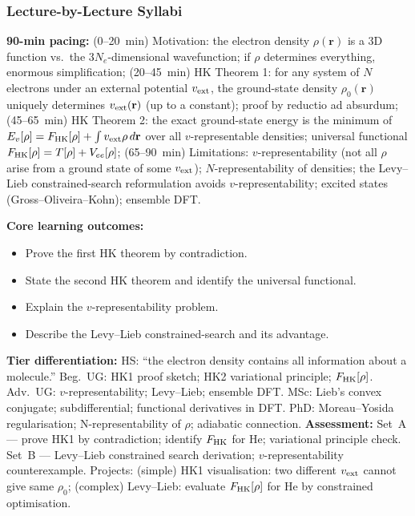 \documentclass[11pt,a4paper]{article}
\begin{document}
\subsubsection*{Lecture-by-Lecture Syllabi}

\begin{tcolorbox}[chembox, title={Module~III.3 / L01: Hohenberg--Kohn Theorems}]
\textbf{90-min pacing:} (0--20~min) Motivation: the electron density $\rho(\mathbf{r})$ is a 3D function vs.\ the $3N_e$-dimensional wavefunction; if $\rho$ determines everything, enormous simplification; (20--45~min) HK Theorem 1: for any system of $N$ electrons under an external potential $v_{\rm ext}$, the ground-state density $\rho_0(\mathbf{r})$ uniquely determines $v_{\rm ext}(\mathbf{r})$ (up to a constant); proof by reductio ad absurdum; (45--65~min) HK Theorem 2: the exact ground-state energy is the minimum of $E_v[\rho]=F_{\rm HK}[\rho]+\int v_{\rm ext}\rho\,d\mathbf{r}$ over all $v$-representable densities; universal functional $F_{\rm HK}[\rho]=T[\rho]+V_{ee}[\rho]$; (65--90~min) Limitations: $v$-representability (not all $\rho$ arise from a ground state of some $v_{\rm ext}$); $N$-representability of densities; the Levy--Lieb constrained-search reformulation avoids $v$-representability; excited states (Gross--Oliveira--Kohn); ensemble DFT.

\medskip\textbf{Core learning outcomes:}
\begin{itemize}[leftmargin=1.4em,topsep=2pt,itemsep=1pt]
  \item Prove the first HK theorem by contradiction.
  \item State the second HK theorem and identify the universal functional.
  \item Explain the $v$-representability problem.
  \item Describe the Levy--Lieb constrained-search and its advantage.
\end{itemize}
\medskip\textbf{Tier differentiation:}
HS: ``the electron density contains all information about a molecule.''
Beg.\ UG: HK1 proof sketch; HK2 variational principle; $F_{\rm HK}[\rho]$.
Adv.\ UG: $v$-representability; Levy--Lieb; ensemble DFT.
MSc: Lieb's convex conjugate; subdifferential; functional derivatives in DFT.
PhD: Moreau--Yosida regularisation; N-representability of $\rho$; adiabatic connection.
\medskip\textbf{Assessment:}
Set~A --- prove HK1 by contradiction; identify $F_{\rm HK}$ for He; variational principle check.
Set~B --- Levy--Lieb constrained search derivation; $v$-representability counterexample.
Projects: (simple) HK1 visualisation: two different $v_{\rm ext}$ cannot give same $\rho_0$; (complex) Levy--Lieb: evaluate $F_{\rm HK}[\rho]$ for He by constrained optimisation.
\end{tcolorbox}
\end{document}

